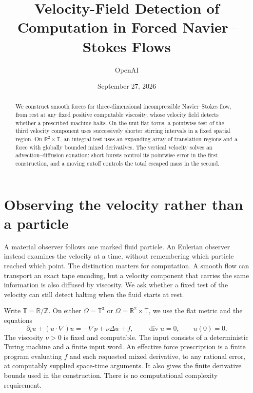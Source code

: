 \documentclass[11pt]{article}
\title{Velocity-Field Detection of Computation in Forced Navier--Stokes Flows}
\author{OpenAI}
\date{September 27, 2026}
\theoremstyle{definition}
\theoremstyle{remark}
\newcommand{\R}{\mathbb R}
\newcommand{\T}{\mathbb T}
\newcommand{\Z}{\mathbb Z}
\DeclareMathOperator{\diver}{div}
\begin{document}
\maketitle
\begin{abstract}
We construct smooth forces for three-dimensional incompressible
Navier--Stokes flow, from rest at any fixed positive computable viscosity,
whose velocity field detects whether a prescribed machine halts.
On the unit flat torus, a pointwise test of the third velocity component
uses successively shorter stirring intervals in a fixed spatial region.
On $\R^2\times\T$, an integral test uses an expanding array of translation
regions and a force with globally bounded mixed derivatives.
The vertical velocity solves an advection--diffusion equation: short
bursts control its pointwise error in the first construction, and a
moving cutoff controls the total escaped mass in the second.
\end{abstract}

\section{Observing the velocity rather than a particle}\label{sec:introduction}

A material observer follows one marked fluid particle. An Eulerian
observer instead examines the velocity at a time, without remembering
which particle reached which point. The distinction matters for
computation. A smooth flow can transport an exact tape encoding, but a
velocity component that carries the same information is also diffused
by viscosity. We ask whether a fixed test of the velocity can still
detect halting when the fluid starts at rest.

Write $\T=\R/\Z$. On either $\Omega=\T^3$ or
$\Omega=\R^2\times\T$, we use the flat metric and the equations
\begin{equation}\label{eq:NS}
 \partial_tu+(u\cdot\nabla)u=-\nabla p+\nu\Delta u+f,
 \qquad \diver u=0,\qquad u(0)=0.
\end{equation}
The viscosity $\nu>0$ is fixed and computable. The input consists of a
deterministic Turing machine and a finite input word. An effective force
prescription is a finite program evaluating $f$ and each requested mixed
derivative, to any rational error, at computably supplied space-time
arguments. It also gives the finite derivative bounds used in the
construction. There is no computational complexity requirement.
\end{document}

